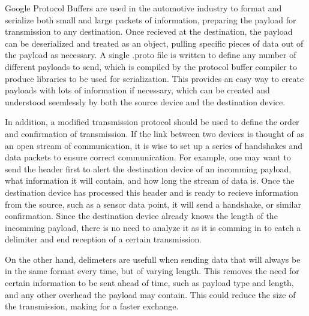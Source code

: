 Google Protocol Buffers \cite{Google:2014} are used in the automotive industry to format and serialize both small and large packets of information, preparing the payload for transmission to any destination. Once recieved at the destination, the payload can be deserialized and treated as an object, pulling specific pieces of data out of the payload as necessary. A single .proto file is written to define any number of different payloads to send, which is compiled by the protocol buffer compiler to produce libraries to be used for serialization. This provides an easy way to create payloads with lots of information if necessary, which can be created and understood seemlessly by both the source device and the destination device.

In addition, a modified transmission protocol \cite{NSI:2014} should be used to define the order and confirmation of transmission. If the link between two devices is thought of as an open stream of communication, it is wise to set up a series of handshakes and data packets to ensure correct communication. For example, one may want to send the header first to alert the destination device of an incomming payload, what information it will contain, and how long the stream of data is. Once the destination device has processed this header and is ready to recieve information from the source, such as a sensor data point, it will send a handshake, or similar confirmation. Since the destination device already knows the length of the incomming payload, there is no need to analyze it as it is comming in to catch a delimiter and end reception of a certain transmission.

On the other hand, delimeters are usefull when sending data that will always be in the same format every time, but of varying length. This removes the need for certain information to be sent ahead of time, such as payload type and length, and any other overhead the payload may contain. This could reduce the size of the transmission, making for a faster exchange.







